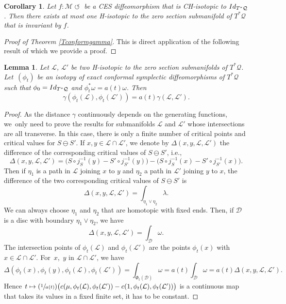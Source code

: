 \documentclass[11pt]{article}
\newcommand{\ie}{i.e.,\xspace}
\numberwithin{equation}{section}
\numberwithin{figure}{section}
\numberwithin{table}{section}
\newcommand{\Psfrac}[2]{(\sfrac{#1}{#2})}
\def\mto{\mathchoice{\longmapsto}{\mapsto}{\mapsto}{\mapsto}}
\providecommand{\righttoleftarrow}{\mathrel{\circlearrowleft}}
\newtheorem{corollary}{Corollary}
\newtheorem{lemma}{Lemma}
\theoremstyle{definition}
\def\cD{{\mathcal D}}
\def\cL{{\mathcal L}}
\def\cM{{\mathcal M}}
\def\cQ{{\mathcal Q}}
\begin{document}
\begin{corollary}\label{Cunicityinavariant}
Let $f:\cM \righttoleftarrow$ be a CES diffeomorphism that is CH-isotopic to ${\rm Id}_{T^*\cQ}$. Then there exists at most one H-isotopic to the zero section submanifold of $T^*\cQ$ that is invariant by $f$.
\end{corollary}

\begin{proof}[Proof of Theorem \ref{Tconformgamma}]
This is direct application of the following result of which we provide a proof.
\end{proof}

\begin{lemma}\label{Lconformgamma}
Let $\cL$, $\cL'$ be two H-isotopic to the zero section submanifolds of $T^*\cQ$. Let~$(\phi_t)$ be an isotopy of exact conformal symplectic diffeomorphisms of $T^*\cQ$ such that $\phi_0={\rm Id}_{T^*\cQ}$ and $\phi_t^*\omega=a(t)\omega$. Then
\[
\gamma(\phi_t(\cL), \phi_t(\cL'))=a(t)\gamma(\cL, \cL').
\]
\end{lemma}

\begin{proof} As the distance $\gamma$ continuously depends on the generating functions, we~only need to prove the results for submanifolds $\cL$ and $\cL'$ whose intersections are all transverse. In this case, there is only a finite number of critical points and critical values for $S\ominus S'$. If $x, y\in\cL\cap\cL'$, we denote by $\Delta(x, y, \cL, \cL')$ the difference of the corresponding critical values of $S\ominus S'$, \ie
\[
\Delta(x, y, \cL, \cL')=\Big(S\circ j_S^{-1}(y)-S'\circ j_{S'}^{-1}(y)\Big)-\Big(S\circ j_S^{-1}(x)-S'\circ j_{S'}^{-1}(x)\Big).
\]
Then if $\eta_1$ is a path in $\cL$ joining $x$ to $y$ and $\eta_2$ a path in $\cL'$ joining $y$ to $x$, the difference of the two corresponding critical values of $S\ominus S'$ is
\[
\Delta(x, y, \cL, \cL')=\int_{\eta_1\vee\eta_2}\lambda.
\]
We can always choose $\eta_1$ and $\eta_2$ that are homotopic with fixed ends. Then, if $\cD$ is a disc with boundary $\eta_1\vee\eta_2$, we have
\[
\Delta(x, y, \cL, \cL')=\int_{\cD}\omega.
\]
The intersection points of $\phi_t(\cL)$ and $\phi_t(\cL')$ are the points $\phi_t(x)$ with $x\in\cL\cap \cL'$. For~$x$,~$y$ in $\cL\cap\cL'$, we have
\[
\Delta(\phi_t(x), \phi_t(y), \phi_t(\cL), \phi_t(\cL'))=\int_{\Phi_t(\cD)}\omega=a(t)\int_\cD\omega=a(t)\Delta(x, y, \cL, \cL').
\]
Hence $t\mto \Psfrac{1}{a(t)}\big(c(\mu, \phi_t(\cL), \phi_t(\cL'))-c(1, \phi_t(\cL), \phi_t(\cL'))\big)$ is a continuous map that takes its values in a fixed finite set, it has to be constant.
\end{proof}
\end{document}
